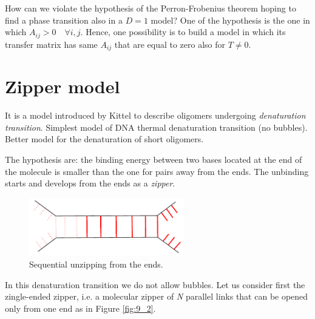 \documentclass[../main/main.tex]{subfiles}
\begin{document}
How can we violate the hypothesis of the Perron-Frobenius theorem hoping to find a phase transition also in a \( D=1 \) model? One of the hypothesis is the one in which \( A_{ij}>0 \quad \forall i,j \). Hence, one possibility is to build a model in which its transfer matrix has same \( A_{ij} \) that are equal to zero also for \( T \neq 0 \).

\section{Zipper model }
It is a model introduced by Kittel to describe oligomers undergoing \emph{denaturation transition}.
Simplest model of DNA thermal denaturation transition (no bubbles). Better model for the denaturation of short oligomers.

The hypothesis are: the binding energy between two bases located at the end of the molecule is smaller than the one for pairs away from the ends. The unbinding starts and develops from the ends as a \emph{zipper}.
\begin{figure}[h!]
\centering
\includegraphics[width=0.6\textwidth]{../lessons/9_image/1.pdf}
\caption{\label{fig:9_1} Sequential unzipping from the ends.}
\end{figure}

In this denaturation transition we do not allow bubbles.
Let us consider first the zingle-ended zipper, i.e. a molecular zipper of \emph{N} parallel links that can be opened only from one end as in Figure \ref{fig:9_2}.
\end{document}
